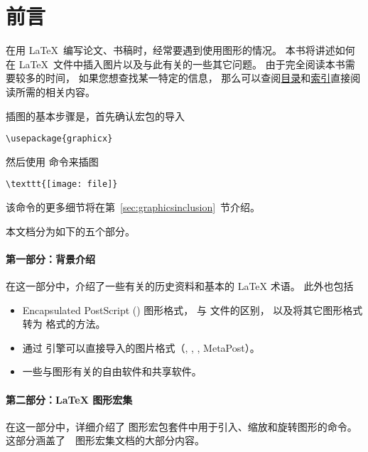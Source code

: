 \section*{前言}
\label{sect:preface}

在用 \LaTeX\ 编写论文、书稿时，经常要遇到使用图形的情况。
本书将讲述如何在 \LaTeX\ 文件中插入图片以及与此有关的一些其它问题。
由于完全阅读本书需要较多的时间，
如果您想查找某一特定的信息，
那么可以查阅\hyperref[toc]{目录}和\hyperref[sec:index]{索引}直接阅读所需的相关内容。

插图的基本步骤是，首先确认宏包的导入
\begin{lstlisting}
\usepackage{graphicx}
\end{lstlisting}
然后使用  命令来插图
\begin{lstlisting}
\texttt{[image: file]}
\end{lstlisting}
该命令的更多细节将在第~\ref{sec:graphicsinclusion}~节介绍。

本文档分为如下的五个部分。

\paragraph{第一部分：背景介绍}
在这一部分中，介绍了一些有关的历史资料和基本的 \LaTeX{} 术语。
此外也包括
\begin{itemize}
	\item Encapsulated PostScript () 图形格式， 与  文件的区别，
	以及将其它图形格式转为  格式的方法。
	\item 通过 \pdfTeX 引擎可以直接导入的图片格式（, , , MetaPost）。
	\item 一些与图形有关的自由软件和共享软件。
\end{itemize}

\paragraph{第二部分：\LaTeX{} 图形宏集}
在这一部分中，详细介绍了 \LaTeXe{} 图形宏包套件中用于引入、缩放和旋转图形的命令。
这部分涵盖了~\LaTeXe{}~图形宏集文档的大部分内容\cite{grfguide}。

